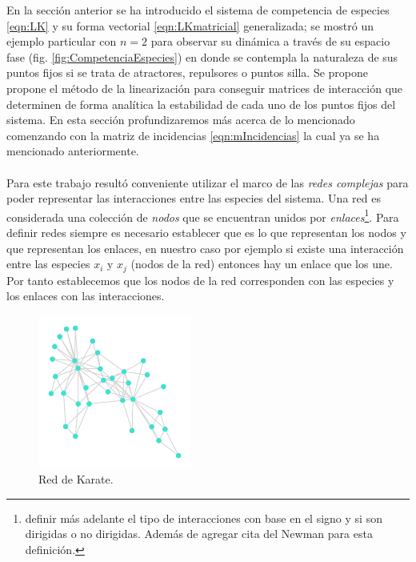 En la sección anterior se ha introducido el sistema de competencia de especies \ref{eqn:LK} y su forma vectorial \ref{eqn:LKmatricial} generalizada; se mostró un ejemplo particular con $n=2$ para observar su dinámica a través de su espacio fase (fig. \ref{fig:CompetenciaEspecies}) en donde se contempla la naturaleza de sus puntos fijos si se trata de atractores, repulsores o puntos silla. Se propone propone el método de la linearización para conseguir matrices de interacción que determinen de forma analítica la estabilidad de cada uno de los puntos fijos del sistema. En esta sección profundizaremos más acerca de lo mencionado comenzando con la matriz de incidencias \ref{eqn:mIncidencias} la cual ya se ha mencionado anteriormente. \\
\\
Para este trabajo resultó conveniente utilizar el marco de las \textit{redes complejas} para poder representar las interacciones entre las especies del sistema. Una red es considerada una colección de \textit{nodos} que se encuentran unidos por \textit{enlaces}\footnote{definir más adelante el tipo de interacciones con base en el signo y si son dirigidas o no dirigidas. Además de agregar cita del Newman para esta definición.}. Para definir redes siempre es necesario establecer que es lo que representan los nodos y que representan los enlaces, en nuestro caso por ejemplo si existe una interacción entre las especies $x_i$ y $x_j$ (nodos de la red) entonces hay un enlace que los une. Por tanto establecemos que los nodos de la red corresponden con las especies y los enlaces con las interacciones.
\begin{figure} \vspace{-30pt} \begin{center}
		\includegraphics[width=0.45\textwidth]{../../Imagenes/karate} 
	\end{center} 
	\vspace{-20pt} 
	\caption{Red de Karate.} 
	\vspace{-10pt}
	\label{fig:RedKarate}
\end{figure} 
